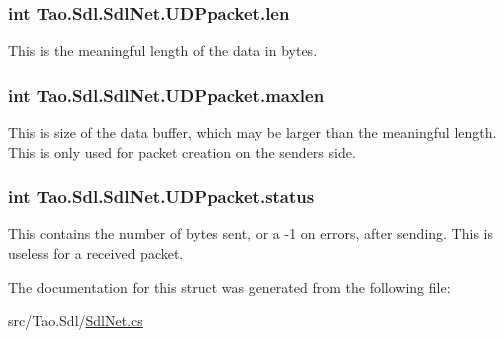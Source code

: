 \hypertarget{struct_tao_1_1_sdl_1_1_sdl_net_1_1_u_d_ppacket_a7d19809b30a730a41a02c0e31d49df23}{
\subsubsection[{len}]{\setlength{\rightskip}{0pt plus 5cm}int {\bf Tao.Sdl.SdlNet.UDPpacket.len}}}
\label{struct_tao_1_1_sdl_1_1_sdl_net_1_1_u_d_ppacket_a7d19809b30a730a41a02c0e31d49df23}


This is the meaningful length of the data in bytes. 

\hypertarget{struct_tao_1_1_sdl_1_1_sdl_net_1_1_u_d_ppacket_a619c5482778530ded5a3415c57a692ec}{
\subsubsection[{maxlen}]{\setlength{\rightskip}{0pt plus 5cm}int {\bf Tao.Sdl.SdlNet.UDPpacket.maxlen}}}
\label{struct_tao_1_1_sdl_1_1_sdl_net_1_1_u_d_ppacket_a619c5482778530ded5a3415c57a692ec}


This is size of the data buffer, which may be larger than the meaningful length. This is only used for packet creation on the senders side. 

\hypertarget{struct_tao_1_1_sdl_1_1_sdl_net_1_1_u_d_ppacket_af69fefcaf40ff9f6d00a13558c014c6b}{
\subsubsection[{status}]{\setlength{\rightskip}{0pt plus 5cm}int {\bf Tao.Sdl.SdlNet.UDPpacket.status}}}
\label{struct_tao_1_1_sdl_1_1_sdl_net_1_1_u_d_ppacket_af69fefcaf40ff9f6d00a13558c014c6b}


This contains the number of bytes sent, or a -\/1 on errors, after sending. This is useless for a received packet. 



The documentation for this struct was generated from the following file:\begin{DoxyCompactItemize}
\item 
src/Tao.Sdl/\hyperlink{_sdl_net_8cs}{SdlNet.cs}\end{DoxyCompactItemize}
